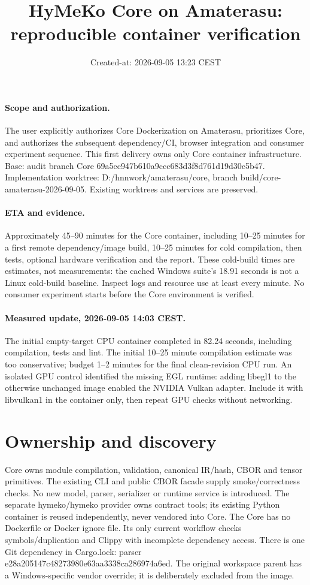 \documentclass[11pt,a4paper]{article}
\title{HyMeKo Core on Amaterasu: reproducible container verification}
\date{Created-at: 2026-09-05 13:23 CEST}
\begin{document}
\maketitle
\paragraph{Scope and authorization.}
The user explicitly authorizes Core Dockerization on Amaterasu, prioritizes Core,
and authorizes the subsequent dependency/CI, browser integration and consumer
experiment sequence. This first delivery owns only Core container infrastructure.
Base: audit branch Core 69a5ec947b610a9ccc683d3f8d761d19d30c5b47.
Implementation worktree: D:/hnnwork/amaterasu/core, branch
build/core-amaterasu-2026-09-05. Existing worktrees and services are preserved.
\paragraph{ETA and evidence.}
Approximately 45--90 minutes for the Core container, including 10--25 minutes
for a first remote dependency/image build, 10--25 minutes for cold compilation,
then tests, optional hardware verification and the report. These cold-build times
are estimates, not measurements: the cached Windows suite's 18.91 seconds is not
a Linux cold-build baseline. Inspect logs and resource use at least every minute.
No consumer experiment starts before the Core environment is verified.
\paragraph{Measured update, 2026-09-05 14:03 CEST.}
The initial empty-target CPU container completed in 82.24 seconds, including
compilation, tests and lint. The initial 10--25 minute compilation estimate was
too conservative; budget 1--2 minutes for the final clean-revision CPU run.
An isolated GPU control identified the missing EGL runtime: adding libegl1 to
the otherwise unchanged image enabled the NVIDIA Vulkan adapter. Include it
with libvulkan1 in the container only, then repeat GPU checks without networking.
\section{Ownership and discovery}
Core owns module compilation, validation, canonical IR/hash, CBOR and tensor
primitives. The existing CLI and public CBOR facade supply smoke/correctness
checks. No new model, parser, serializer or runtime service is introduced.
The separate hymeko/hymeko provider owns contract tools; its existing Python
container is reused independently, never vendored into Core.
The Core has no Dockerfile or Docker ignore file. Its only current workflow
checks symbols/duplication and Clippy with incomplete dependency access.
There is one Git dependency in Cargo.lock: parser
e28a205147c48273980e63aa3338ca286974a6ed. The original workspace parent has a
Windows-specific vendor override; it is deliberately excluded from the image.
\end{document}
